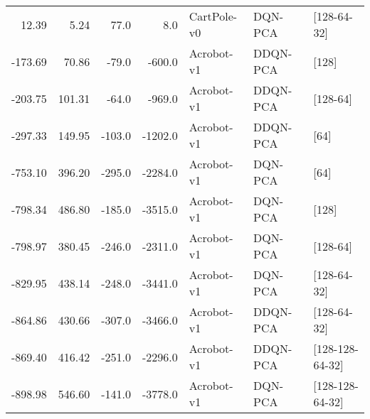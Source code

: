 \begin{tabular}{rrrrlll}
   12.39 &    5.24 &   77.0 &     8.0 &     CartPole-v0 &   DQN-PCA &      [128-64-32] \\
 -173.69 &   70.86 &  -79.0 &  -600.0 &      Acrobot-v1 &  DDQN-PCA &            [128] \\
 -203.75 &  101.31 &  -64.0 &  -969.0 &      Acrobot-v1 &  DDQN-PCA &         [128-64] \\
 -297.33 &  149.95 & -103.0 & -1202.0 &      Acrobot-v1 &  DDQN-PCA &             [64] \\
 -753.10 &  396.20 & -295.0 & -2284.0 &      Acrobot-v1 &   DQN-PCA &             [64] \\
 -798.34 &  486.80 & -185.0 & -3515.0 &      Acrobot-v1 &   DQN-PCA &            [128] \\
 -798.97 &  380.45 & -246.0 & -2311.0 &      Acrobot-v1 &   DQN-PCA &         [128-64] \\
 -829.95 &  438.14 & -248.0 & -3441.0 &      Acrobot-v1 &   DQN-PCA &      [128-64-32] \\
 -864.86 &  430.66 & -307.0 & -3466.0 &      Acrobot-v1 &  DDQN-PCA &      [128-64-32] \\
 -869.40 &  416.42 & -251.0 & -2296.0 &      Acrobot-v1 &  DDQN-PCA &  [128-128-64-32] \\
 -898.98 &  546.60 & -141.0 & -3778.0 &      Acrobot-v1 &   DQN-PCA &  [128-128-64-32] \\
\bottomrule
\end{tabular}
